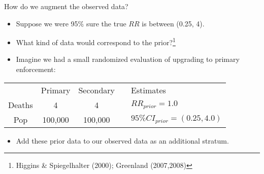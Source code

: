 \documentclass[english]{beamer}\usepackage[]{graphicx}\usepackage[]{color}
\providecommand{\tabularnewline}{\\}
\begin{document}
\begin{frame}{How do we augment the observed data?}
\begin{itemize}
\item Suppose we were 95\% sure the true $RR$ is between (0.25, 4).
\item What kind of data would correspond to the prior?\footnote{Higgins \& Spiegelhalter (2000); Greenland (2007,2008)}
\end{itemize}

\pause{\medskip{}
}
\begin{itemize}
\item Imagine we had a small randomized evaluation of upgrading to primary
enforcement:
\end{itemize}
\begin{center}
\begin{tabular}{ccccl}
\cline{1-4} 
 &
Primary &
Secondary &
 &
Estimates\tabularnewline
\cline{1-4} 
Deaths &
4 &
4 &
 &
$RR_{prior}=1.0$\tabularnewline
Pop &
100,000 &
100,000 &
 &
$95\%CI_{prior}=(0.25,4.0)$\tabularnewline
\cline{1-4} 
\end{tabular}
\par\end{center}

\medskip{}

\begin{itemize}
\item Add these prior data to our observed data as an additional stratum.
\end{itemize}
\end{frame}
%
\end{document}
